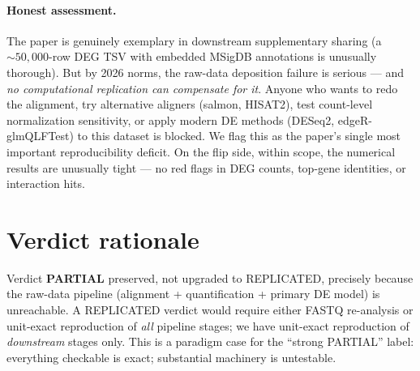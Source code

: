 \documentclass[11pt]{article}
\begin{document}
\paragraph{Honest assessment.}
The paper is genuinely exemplary in downstream supplementary sharing (a $\sim 50{,}000$-row DEG TSV with embedded MSigDB annotations is unusually thorough). But by 2026 norms, the raw-data deposition failure is serious --- and \emph{no computational replication can compensate for it}. Anyone who wants to redo the alignment, try alternative aligners (salmon, HISAT2), test count-level normalization sensitivity, or apply modern DE methods (DESeq2, edgeR-glmQLFTest) to this dataset is blocked. We flag this as the paper's single most important reproducibility deficit. On the flip side, within scope, the numerical results are unusually tight --- no red flags in DEG counts, top-gene identities, or interaction hits.

\section{Verdict rationale}
Verdict \textbf{PARTIAL} preserved, not upgraded to REPLICATED, precisely because the raw-data pipeline (alignment + quantification + primary DE model) is unreachable. A REPLICATED verdict would require either FASTQ re-analysis or unit-exact reproduction of \emph{all} pipeline stages; we have unit-exact reproduction of \emph{downstream} stages only. This is a paradigm case for the ``strong PARTIAL'' label: everything checkable is exact; substantial machinery is untestable.
\end{document}
